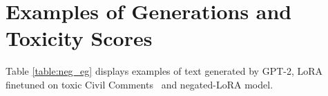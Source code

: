 







\section{Examples of Generations and Toxicity Scores}
\label{sec:apx_example_toxic}


Table \ref{table:neg_eg} displays examples of text generated by GPT-2, LoRA finetuned on toxic Civil Comments~\citep{borkan2019nuanced} and negated-LoRA model.



